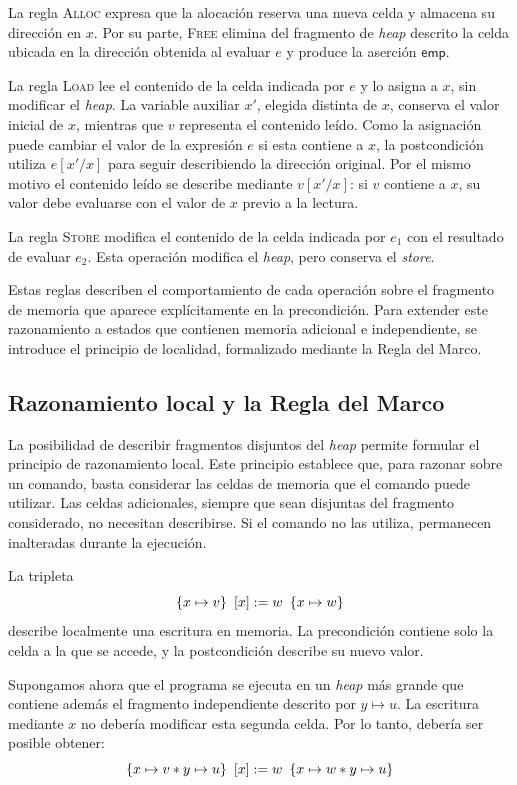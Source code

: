 \documentclass[a4paper,	11pt]{report}
\begin{document}
La regla \textsc{Alloc} expresa que la alocación reserva una nueva celda y almacena su dirección en $x$.
Por su parte,
\textsc{Free} elimina del fragmento de \emph{heap} descrito la celda ubicada en la dirección obtenida al evaluar $e$
y produce la aserción $\mathsf{emp}$.

La regla \textsc{Load}
lee el contenido de la celda indicada por $e$ y lo asigna a $x$,
sin modificar el \emph{heap}.
La variable auxiliar $x'$,
elegida distinta de $x$,
conserva el valor inicial de $x$,
mientras que $v$ representa el contenido leído.
Como la asignación puede cambiar el valor de la expresión $e$ si esta contiene a $x$,
la postcondición utiliza $e[x'/x]$ para seguir describiendo la dirección original.
Por el mismo motivo el contenido leído se describe mediante $v[x'/x]$:
si $v$ contiene a $x$,
su valor debe evaluarse con el valor de $x$ previo a la lectura.

La regla \textsc{Store} modifica el contenido de la celda
indicada por $e_1$ con el resultado de evaluar $e_2$.
Esta operación modifica el \emph{heap},
pero conserva el \emph{store}.

Estas reglas describen el comportamiento de cada operación sobre el fragmento de memoria que aparece explícitamente en la precondición.
Para extender este razonamiento a estados que contienen memoria adicional e independiente,
se introduce el principio de localidad,
formalizado mediante la Regla del Marco.

\subsection*{Razonamiento local y la Regla del Marco}
La posibilidad de describir fragmentos disjuntos del \emph{heap}
permite formular el principio de razonamiento local.
Este principio establece que,
para razonar sobre un comando,
basta considerar las celdas de memoria que el comando puede utilizar.
Las celdas adicionales, siempre que sean disjuntas del fragmento considerado,
no necesitan describirse.
Si el comando no las utiliza, permanecen inalteradas durante la ejecución.

\begin{ejemplo}
La tripleta
$$\left\{ x \mapsto v \right\}~[x] := w~\left\{ x \mapsto w \right\}$$
describe localmente una escritura en memoria.
La precondición contiene solo la celda a la que se accede,
y la postcondición describe su nuevo valor.

Supongamos ahora que el programa se ejecuta en un \emph{heap} más grande
que contiene además el fragmento independiente descrito por $y \mapsto u$.
La escritura mediante $x$ no debería modificar esta segunda celda.
Por lo tanto, debería ser posible obtener:
$$\left\{ x \mapsto v * y \mapsto u \right\}~[x] := w~\left\{ x \mapsto w * y \mapsto u \right\}$$
\end{ejemplo}
\end{document}
